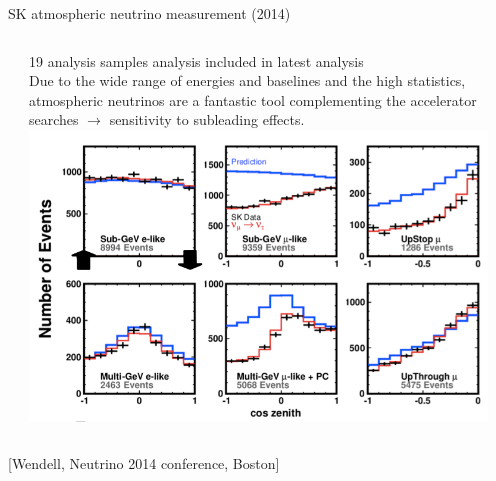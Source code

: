 \begin{frame}[t]{SK atmospheric neutrino measurement (2014)}
\begin{columns}
\begin{column}{0.30\textwidth}
  \end{column}
  \begin{column}{0.70\textwidth}
    {\scriptsize
      19 analysis samples analysis included in latest analysis\\
      Due to the wide range of energies and baselines and the high statistics,
      atmospheric neutrinos are a fantastic tool complementing the accelerator searches $\rightarrow$
      sensitivity to subleading effects.\\
    }
    \includegraphics[width=0.95\textwidth]{./images/3nu/atmo/sk_zenith_2014.png}
  \end{column}
\end{columns}
{\scriptsize \color{blue}[Wendell, Neutrino 2014 conference, Boston]}
\end{frame}


